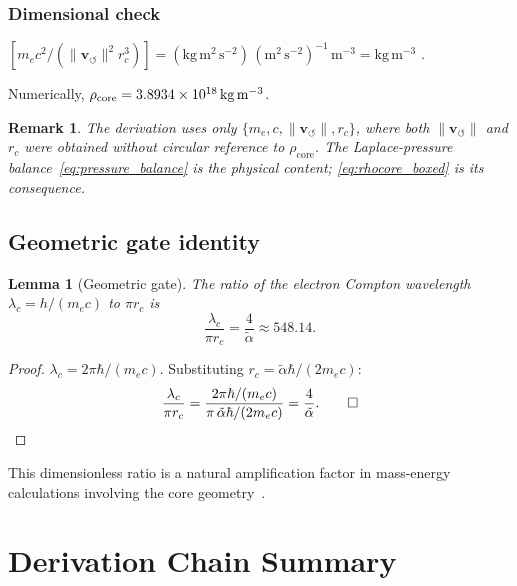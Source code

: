 \documentclass[aps,pra,preprint,longbibliography,nofootinbib]{revtex4-2}
\newtheorem{lemma}{Lemma}
\newtheorem{remark}{Remark}
\newcommand{\vnorm}{\lVert\mathbf{v}_{\!\boldsymbol{\circlearrowleft}}\rVert} %
\newcommand{\rhocore}{\rho_{\mathrm{core}}}      %
\newcommand{\rc}{r_c}                            %
\newcommand{\lc}{\lambda_c}                      %
\begin{document}
\subsubsection*{Dimensional check}
$[m_e c^2 / (\vnorm^2 \rc^3)]
= \mathrm{(kg\,m^2\,s^{-2})\,(m^2\,s^{-2})^{-1}\,m^{-3}}
= \mathrm{kg\,m^{-3}}$ \checkmark.

Numerically, $\rhocore = \SI{3.893\,4e18}{\kilogram\per\cubic\meter}$.

\begin{remark}
\label{rem:rhocore_noncircular}
The derivation uses only $\{m_e, c, \vnorm, \rc\}$,
where both $\vnorm$ and $\rc$ were obtained without circular
reference to $\rhocore$.
The Laplace-pressure balance~\eqref{eq:pressure_balance} is the
physical content; \eqref{eq:rhocore_boxed} is its consequence.
\end{remark}

\subsection{Geometric gate identity}
\label{sec:gate}

\begin{lemma}[Geometric gate]
\label{lem:gate}
The ratio of the electron Compton wavelength $\lc = h/(m_e c)$
to $\pi\rc$ is
\begin{equation}
  \frac{\lc}{\pi\rc} = \frac{4}{\tilde\alpha} \approx 548.14.
  \label{eq:gate}
\end{equation}
\end{lemma}

\begin{proof}
$\lc = 2\pi\hbar/(m_e c)$.
Substituting $\rc = \tilde\alpha\hbar/(2m_e c)$:
\begin{equation}
  \frac{\lc}{\pi\rc}
  = \frac{2\pi\hbar/(m_e c)}{\pi\,\tilde\alpha\hbar/(2m_e c)}
  = \frac{4}{\tilde\alpha}. \qed
\end{equation}
\end{proof}

This dimensionless ratio is a natural amplification factor in
mass-energy calculations involving the core
geometry~\cite{CantarellaKusner2002}.

\section{Derivation Chain Summary}
\label{sec:chain}
\end{document}
